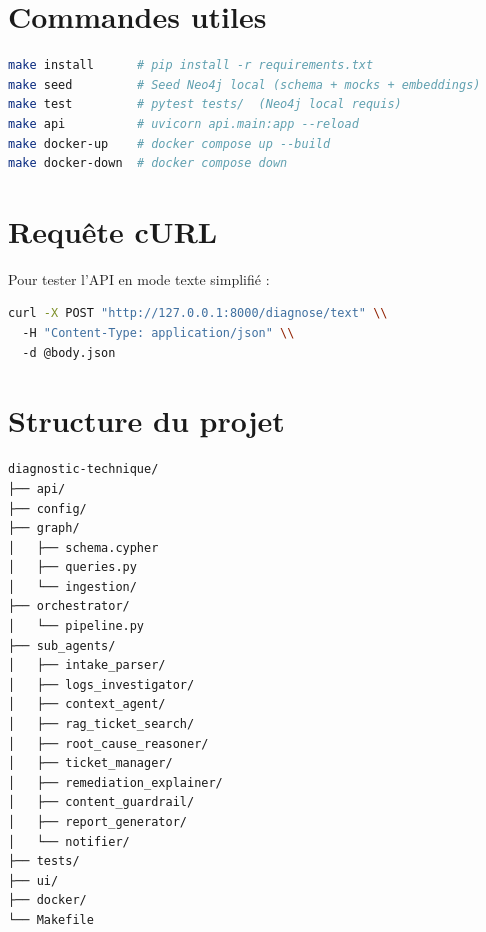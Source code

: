 \section*{Commandes utiles}
\begin{lstlisting}[language=bash, caption={Commandes principales du Makefile}]
make install      # pip install -r requirements.txt
make seed         # Seed Neo4j local (schema + mocks + embeddings)
make test         # pytest tests/  (Neo4j local requis)
make api          # uvicorn api.main:app --reload
make docker-up    # docker compose up --build
make docker-down  # docker compose down
\end{lstlisting}

\section*{Requête cURL}
Pour tester l'API en mode texte simplifié :

\begin{lstlisting}[language=bash, caption={Appel de l'API diagnose/text}]
curl -X POST "http://127.0.0.1:8000/diagnose/text" \\
  -H "Content-Type: application/json" \\
  -d @body.json
\end{lstlisting}

\section*{Structure du projet}
\begin{lstlisting}[language=bash, caption={Arborescence simplifiee}]
diagnostic-technique/
├── api/
├── config/
├── graph/
│   ├── schema.cypher
│   ├── queries.py
│   └── ingestion/
├── orchestrator/
│   └── pipeline.py
├── sub_agents/
│   ├── intake_parser/
│   ├── logs_investigator/
│   ├── context_agent/
│   ├── rag_ticket_search/
│   ├── root_cause_reasoner/
│   ├── ticket_manager/
│   ├── remediation_explainer/
│   ├── content_guardrail/
│   ├── report_generator/
│   └── notifier/
├── tests/
├── ui/
├── docker/
└── Makefile
\end{lstlisting}
